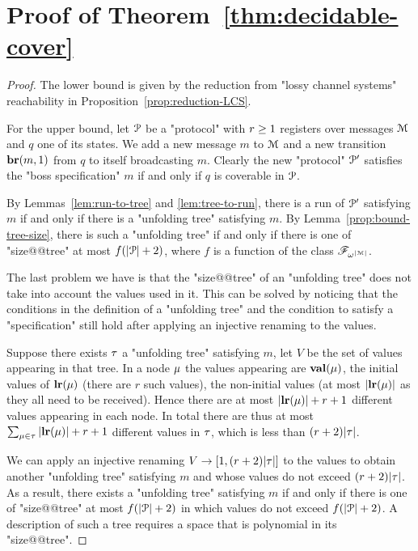 \section{Proof of Theorem~\ref{thm:decidable-cover}}
\label{app:decidability}


\decidablecover*

\begin{proof}
	The lower bound is given by the reduction from "lossy channel systems" reachability in Proposition~\ref{prop:reduction-LCS}.
	
	For the upper bound, let $\mathcal{P}$ be a "protocol" with $r \geq 1$ registers over messages $\mathcal{M}$ and $q$ one of its states. We add a new message $m$ to $\mathcal{M}$ and a new transition $\textbf{br}(m, 1)$ from $q$ to itself broadcasting $m$. 
	Clearly the new "protocol" $\mathcal{P}'$ satisfies the "boss specification" $m$ if and only if $q$ is coverable in $\mathcal{P}$.
	
	By Lemmas~\ref{lem:run-to-tree} and \ref{lem:tree-to-run}, there is a run of $\mathcal{P}'$ satisfying $m$ if and only if there is a "unfolding tree" satisfying $m$.
	By Lemma~\ref{prop:bound-tree-size}, there is such a "unfolding tree" if and only if there is one of "size@@tree" at most $f(|\mathcal{P}|+2)$, where $f$ is a function of the class $\mathscr{F}_{\omega^{|\mathcal{M}|}}$.
	
	The last problem we have is that the "size@@tree" of an "unfolding tree" does not take into account the values used in it. This can be solved by noticing that the conditions in the definition of a "unfolding tree" and the condition to satisfy a "specification" still hold after applying an injective renaming to the values. 
	
	Suppose there exists $\tau$ a "unfolding tree" satisfying $m$, let $V$ be the set of values appearing in that tree. In a node $\mu$ the values appearing are $\mathbf{val}(\mu)$, the initial values of $\mathbf{lr}(\mu)$ (there are $r$ such values), the non-initial values (at most $|\mathbf{lr}(\mu)|$ as they all need to be received).
	Hence there are at most $|\mathbf{lr}(\mu)| + r +1$ different values appearing in each node.
	In total there are thus at most $\sum_{\mu \in \tau} |\mathbf{lr}(\mu)| + r +1$ different values in $\tau$, which is less than $(r+2)|\tau|$.
	
	We can apply an injective renaming $V \to [1,(r+2)|\tau|]$ to the values to obtain another "unfolding tree" satisfying $m$ and whose values do not exceed $(r+2)|\tau|$.
	As a result, there exists a "unfolding tree" satisfying $m$ if and only if there is one of "size@@tree" at most $f(|\mathcal{P}|+2)$ in which values do not exceed $f(|\mathcal{P}|+2)$. A description of such a tree requires a space that is polynomial in its "size@@tree".
	

\end{proof}
